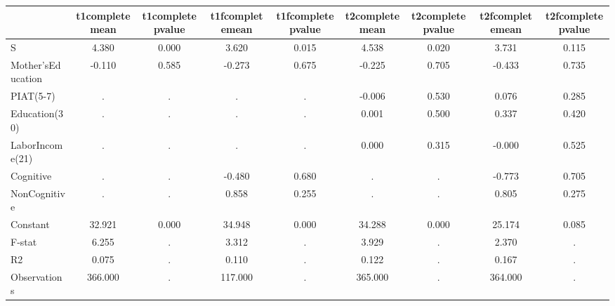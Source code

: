 \begin{table}[htbp]
\begin{tabular}{lcccccccc} \hline \hline
 & t1completemean  & t1completepvalue  & t1fcompletemean  & t1fcompletepvalue  & t2completemean  & t2completepvalue  & t2fcompletemean  & t2fcompletepvalue  \\  \hline 
S &     4.380 &     0.000 &     3.620 &     0.015 &     4.538 &     0.020 &     3.731 &     0.115 \\  
Mother'sEducation &    -0.110 &     0.585 &    -0.273 &     0.675 &    -0.225 &     0.705 &    -0.433 &     0.735 \\  
PIAT(5-7) &         . &         . &         . &         . &    -0.006 &     0.530 &     0.076 &     0.285 \\  
Education(30) &         . &         . &         . &         . &     0.001 &     0.500 &     0.337 &     0.420 \\  
LaborIncome(21) &         . &         . &         . &         . &     0.000 &     0.315 &    -0.000 &     0.525 \\  
Cognitive &         . &         . &    -0.480 &     0.680 &         . &         . &    -0.773 &     0.705 \\  
NonCognitive &         . &         . &     0.858 &     0.255 &         . &         . &     0.805 &     0.275 \\  
Constant &    32.921 &     0.000 &    34.948 &     0.000 &    34.288 &     0.000 &    25.174 &     0.085 \\  
F-stat &     6.255 &         . &     3.312 &         . &     3.929 &         . &     2.370 &         . \\  
R2 &     0.075 &         . &     0.110 &         . &     0.122 &         . &     0.167 &         . \\  
Observations &   366.000 &         . &   117.000 &         . &   365.000 &         . &   364.000 &         . \\  
\hline \hline \end{tabular}
\end{table}
